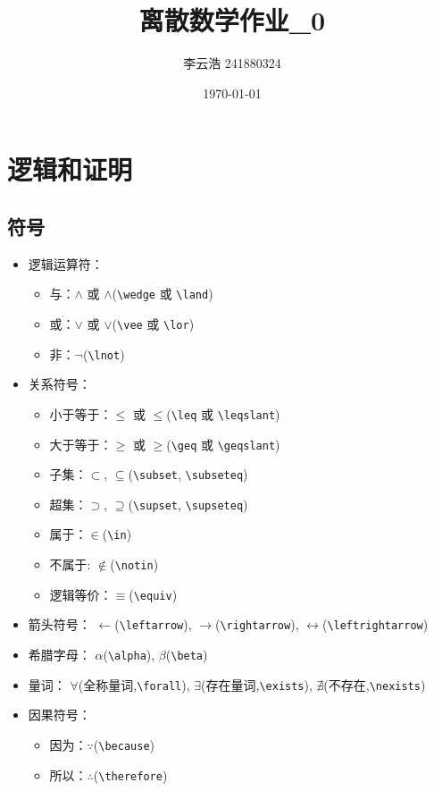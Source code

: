 \documentclass[12pt, a4paper]{ctexart}
\title{离散数学作业\_0}
\author{李云浩 241880324}
\date{\today}
\begin{document}
\maketitle
\tableofcontents

\section{逻辑和证明}
\subsection{符号}

\begin{itemize}
    \item 逻辑运算符：
    \begin{itemize}
        \item 与：$\wedge$ 或 $\land$(\verb|\wedge| 或 \verb|\land|)
        \item 或：$\vee$ 或 $\lor$(\verb|\vee| 或 \verb|\lor|)
        \item 非：$\lnot$(\verb|\lnot|)
    \end{itemize}
    
    \item 关系符号：
    \begin{itemize}
        \item 小于等于：$\leq$ 或 $\leqslant$(\verb|\leq| 或 \verb|\leqslant|)
        \item 大于等于：$\geq$ 或 $\geqslant$(\verb|\geq| 或 \verb|\geqslant|)
        \item 子集：$\subset$, $\subseteq$(\verb|\subset|, \verb|\subseteq|)
        \item 超集：$\supset$, $\supseteq$(\verb|\supset|, \verb|\supseteq|)
        \item 属于：$\in$(\verb|\in|)
        \item 不属于: $\notin$(\verb|\notin|)
        \item 逻辑等价：$\equiv$(\verb|\equiv|)
    \end{itemize}
    
    \item 箭头符号：
    $\leftarrow$(\verb|\leftarrow|),
    $\rightarrow$(\verb|\rightarrow|),
    $\leftrightarrow$(\verb|\leftrightarrow|)

    \item 希腊字母：
    $\alpha$(\verb|\alpha|),
    $\beta$(\verb|\beta|)

    \item 量词：
    $\forall$(全称量词,\verb|\forall|),
    $\exists$(存在量词,\verb|\exists|),
    $\nexists$(不存在,\verb|\nexists|)
    
    \item 因果符号：
    \begin{itemize}
        \item 因为：$\because$(\verb|\because|)
        \item 所以：$\therefore$(\verb|\therefore|)
    \end{itemize}
\end{itemize}
\end{document}
